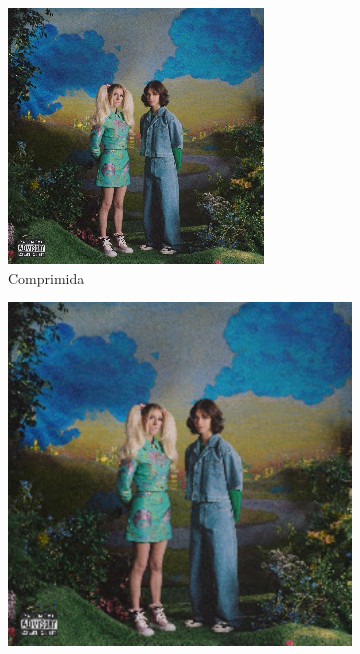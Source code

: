 \documentclass{article}
\begin{document}
\begin{figure}[ht]
\begin{subfigure}{0.48\textwidth}
    \includegraphics[width=\textwidth]{imagens-reais/not-tight/compressed.png}
    \caption{Comprimida}
  \end{subfigure}%
  \hfill
  \begin{subfigure}{0.48\textwidth}
    \centering
    \includegraphics[width=\textwidth]{imagens-reais/not-tight/decompressed-bilinear.png}

\end{subfigure}
\end{figure}
\end{document}
